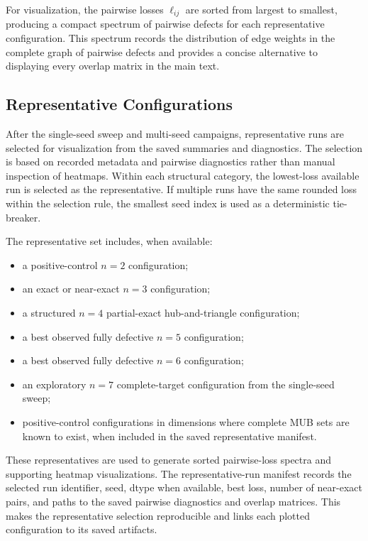 \documentclass[a4paper,twocolumn,11pt,amsfonts,amssymb]{quantumarticle}
\begin{document}
For visualization, the pairwise losses \(\ell_{ij}\) are sorted from largest to smallest, producing a compact spectrum of pairwise defects for each representative configuration. This spectrum records the distribution of edge weights in the complete graph of pairwise defects and provides a concise alternative to displaying every overlap matrix in the main text.

\subsection{Representative Configurations}

After the single-seed sweep and multi-seed campaigns, representative runs are selected for visualization from the saved summaries and diagnostics. The selection is based on recorded metadata and pairwise diagnostics rather than manual inspection of heatmaps. Within each structural category, the lowest-loss available run is selected as the representative. If multiple runs have the same rounded loss within the selection rule, the smallest seed index is used as a deterministic tie-breaker.

The representative set includes, when available:
\begin{itemize}
    \item a positive-control \(n=2\) configuration;
    \item an exact or near-exact \(n=3\) configuration;
    \item a structured \(n=4\) partial-exact hub-and-triangle configuration;
    \item a best observed fully defective \(n=5\) configuration;
    \item a best observed fully defective \(n=6\) configuration;
    \item an exploratory \(n=7\) complete-target configuration from the single-seed sweep;
    \item positive-control configurations in dimensions where complete MUB sets are known to exist, when included in the saved representative manifest.
\end{itemize}

These representatives are used to generate sorted pairwise-loss spectra and supporting heatmap visualizations. The representative-run manifest records the selected run identifier, seed, dtype when available, best loss, number of near-exact pairs, and paths to the saved pairwise diagnostics and overlap matrices. This makes the representative selection reproducible and links each plotted configuration to its saved artifacts.
\end{document}
